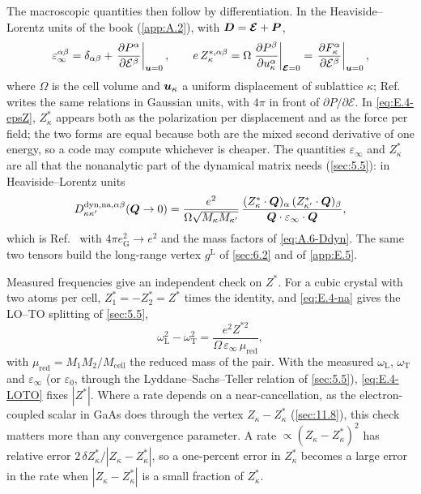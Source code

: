The macroscopic quantities then follow by differentiation. In the Heaviside--Lorentz units of the book (\cref{app:A.2}), with $\bm{D} = \bm{\mathcal{E}} + \bm{P}$,
\begin{equation}
  \varepsilon_\infty^{\alpha\beta} = \delta_{\alpha\beta} + \left.\frac{\partial P^\alpha}{\partial\mathcal{E}^\beta}\right|_{\bm{u} = 0},
  \qquad
  e\,Z^{*,\alpha\beta}_\kappa = \Omega\left.\frac{\partial P^\beta}{\partial u^\alpha_\kappa}\right|_{\bm{\mathcal{E}} = 0}
  = \left.\frac{\partial F^\alpha_\kappa}{\partial\mathcal{E}^\beta}\right|_{\bm{u} = 0} ,
  \label{eq:E.4-epsZ}
\end{equation}
where $\Omega$ is the cell volume and $\bm{u}_\kappa$ a uniform displacement of sublattice $\kappa$; Ref.~\cite[Eqs.~(94)--(96)]{baroni2001phonons} writes the same relations in Gaussian units, with $4\pi$ in front of $\partial P/\partial\mathcal{E}$. In \cref{eq:E.4-epsZ}, $Z^*_\kappa$ appears both as the polarization per displacement and as the force per field; the two forms are equal because both are the mixed second derivative of one energy, so a code may compute whichever is cheaper. The quantities $\varepsilon_\infty$ and $Z^*_\kappa$ are all that the nonanalytic part of the dynamical matrix needs (\cref{sec:5.5}): in Heaviside--Lorentz units
\begin{equation}
  D^{\mathrm{dyn,na},\alpha\beta}_{\kappa\kappa'}(\bm{Q}\to 0) = \frac{e^2}{\Omega\sqrt{M_\kappa M_{\kappa'}}}\,
  \frac{(Z^*_\kappa\cdot\bm{Q})_\alpha\,(Z^*_{\kappa'}\cdot\bm{Q})_\beta}{\bm{Q}\cdot\varepsilon_\infty\cdot\bm{Q}} ,
  \label{eq:E.4-na}
\end{equation}
which is Ref.~\cite[Eq.~(98)]{baroni2001phonons} with $4\pi e^2_{\mathrm{G}} \to e^2$ and the mass factors of \cref{eq:A.6-Ddyn}. The same two tensors build the long-range vertex $g^{\mathrm{L}}$ of \cref{sec:6.2} and of \cref{app:E.5}.

Measured frequencies give an independent check on $Z^*$. For a cubic crystal with two atoms per cell, $Z^*_1 = -Z^*_2 = Z^*$ times the identity, and \cref{eq:E.4-na} gives the LO--TO splitting of \cref{sec:5.5},
\begin{equation}
  \omega_{\mathrm{L}}^2 - \omega_{\mathrm{T}}^2 = \frac{e^2Z^{*2}}{\Omega\,\varepsilon_\infty\,\mu_{\mathrm{red}}} ,
  \label{eq:E.4-LOTO}
\end{equation}
with $\mu_{\mathrm{red}} = M_1M_2/M_{\mathrm{cell}}$ the reduced mass of the pair. With the measured $\omega_{\mathrm{L}}$, $\omega_{\mathrm{T}}$ and $\varepsilon_\infty$ (or $\varepsilon_0$, through the Lyddane--Sachs--Teller relation of \cref{sec:5.5}), \cref{eq:E.4-LOTO} fixes $|Z^*|$. Where a rate depends on a near-cancellation, as the electron-coupled scalar in GaAs does through the vertex $Z_\kappa - Z^*_\kappa$ (\cref{sec:11.8}), this check matters more than any convergence parameter. A rate $\propto (Z_\kappa - Z^*_\kappa)^2$ has relative error $2\,\delta Z^*_\kappa/|Z_\kappa - Z^*_\kappa|$, so a one-percent error in $Z^*_\kappa$ becomes a large error in the rate when $|Z_\kappa - Z^*_\kappa|$ is a small fraction of $Z^*_\kappa$.

